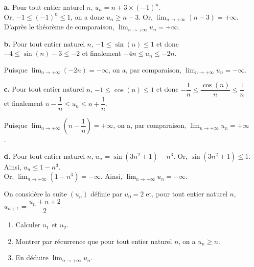 \documentclass[11pt,fleqn, openany]{book} %
\begin{document}
\begin{solution}\textbf{a.} Pour tout entier naturel $n$, $u_n=n+3\times (-1)^n$.\\ Or, $-1 \leqslant (-1)^n \leqslant 1$, on a donc $u_n \geqslant n-3$. Or, $\displaystyle \lim_{n\to + \infty}(n-3) = +\infty$. D'après le théorème de comparaison, $\displaystyle \lim_{n\to + \infty} u_n = +\infty$.

\textbf{b.} Pour tout entier naturel $n$, $-1 \leqslant \sin(n) \leqslant 1$ et donc $-4 \leqslant \sin(n)-3 \leqslant -2$ et finalement $-4n \leqslant u_n \leqslant -2n$.

Puisque $\displaystyle\lim_{n \to + \infty} (-2n)=-\infty$, on a, par comparaison, $\displaystyle\lim_{n \to + \infty}u_n=-\infty$.

\textbf{c.} Pour tout entier naturel $n$, $-1 \leqslant \cos(n) \leqslant 1$ et donc $-\dfrac{1}{n} \leqslant \dfrac{\cos(n)}{n} \leqslant \dfrac{1}{n}$ et finalement $n-\dfrac{1}{n} \leqslant u_n \leqslant n+\dfrac{1}{n}$.

Puisque $\displaystyle\lim_{n \to + \infty} \left(n-\dfrac{1}{n}\right)=+\infty$, on a, par comparaison, $\displaystyle\lim_{n \to + \infty}u_n=+\infty$.

\textbf{d.} Pour tout entier naturel $n$, $u_n=\sin (3n^2+1)-n^3$. Or, $\sin (3n^2+1) \leqslant 1$. Ainsi, $u_n \leqslant 1-n^3$. \\Or, $\displaystyle \lim_{n \to +\infty} (1-n^3)=-\infty$. Ainsi, $\displaystyle \lim_{n \to +\infty} u_n = -\infty$.

\end{solution}


\begin{exercise}On considère la suite $(u_n)$ définie par $u_0=2$ et, pour tout entier naturel $n$, $u_{n+1}=\dfrac{u_n+n+2}{2}$.
\begin{enumerate}
\item Calculer $u_1$ et $u_2$.
\item Montrer par récurrence que pour tout entier naturel $n$, on a $u_n\geqslant n$.
\item En déduire $\displaystyle\lim_{n \to +\infty}u_n$.
\end{enumerate}\end{exercise}
\end{document}
